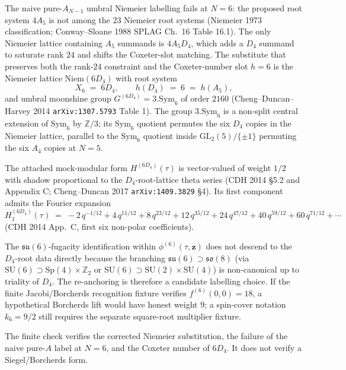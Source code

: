 \begin{remark}[$N = 6$ re-anchoring: the Niemeier $6 D_4$ substitute;
 \ClaimStatusConditional]
\label{rem:wa-6D4-reanchoring}
The naive pure-$A_{N-1}$ umbral Niemeier labelling fails at $N = 6$:
the proposed root system $4 A_5$ is not among the $23$
Niemeier root systems (Niemeier 1973 classification; Conway--Sloane
1988 SPLAG Ch.\ 16 Table 16.1). The only Niemeier lattice containing
$A_5$ summands is $4 A_5 D_4$, which adds a $D_4$ summand to
saturate rank $24$ and shifts the Coxeter-slot matching. The
substitute that preserves both the rank-$24$ constraint and the
Coxeter-number slot $h = 6$ is the Niemeier lattice
$\mathrm{Niem}(6 D_4)$ with root system
\[
 X_6 \;=\; 6 D_4,
 \qquad
 h(D_4) \;=\; 6 \;=\; h(A_5),
\]
and umbral moonshine group $G^{(6D_4)} = 3.\mathrm{Sym}_6$ of order
$2160$ (Cheng--Duncan--Harvey 2014 \texttt{arXiv:1307.5793} Table 1).
The group $3.\mathrm{Sym}_6$ is a non-split central extension of
$\mathrm{Sym}_6$ by $\mathbb Z/3$; its $\mathrm{Sym}_6$ quotient
permutes the six $D_4$ copies in the Niemeier lattice, parallel
to the $\mathrm{Sym}_6$ quotient inside
$\mathrm{GL}_2(5)/\{\pm 1\}$ permuting the six $A_4$ copies at
$N = 5$.

The attached mock-modular form $H^{(6 D_4)}(\tau)$ is vector-valued
of weight $1/2$ with shadow proportional to the $D_4$-root-lattice
theta series (CDH 2014 \S 5.2 and Appendix C; Cheng--Duncan 2017
\texttt{arXiv:1409.3829} \S 4). Its first component admits the
Fourier expansion
\[
 H^{(6 D_4)}_1(\tau)
 \;=\; -2\,q^{-1/12}
 + 4\,q^{11/12} + 8\,q^{23/12} + 12\,q^{35/12}
 + 24\,q^{47/12} + 40\,q^{59/12} + 60\,q^{71/12} + \cdots
\]
(CDH 2014 App.\ C, first six non-polar coefficients).

The $\mathfrak{su}(6)$-fugacity identification within
$\phi^{(6)}(\tau, \mathbf z)$ does not descend to the $D_4$-root
data directly because the branching
$\mathfrak{su}(6) \supset \mathfrak{so}(8)$ (via
$\mathrm{SU}(6) \supset \mathrm{Sp}(4) \times \mathbb Z_2$ or
$\mathrm{SU}(6) \supset \mathrm{SU}(2) \times \mathrm{SU}(4)$) is
non-canonical up to triality of $D_4$. The re-anchoring is therefore a
candidate labelling choice. If the finite Jacobi/Borcherds recognition
fixture verifies $f^{(6)}(0,0)=18$, a hypothetical Borcherds lift would
have honest weight $9$; a spin-cover notation $k_6=9/2$ still requires
the separate square-root multiplier fixture.

The finite check verifies the corrected Niemeier substitution, the
failure of the naive pure-$A$ label at $N=6$, and the Coxeter number of
$6D_4$. It does not verify a Siegel/Borcherds form.
\end{remark}


